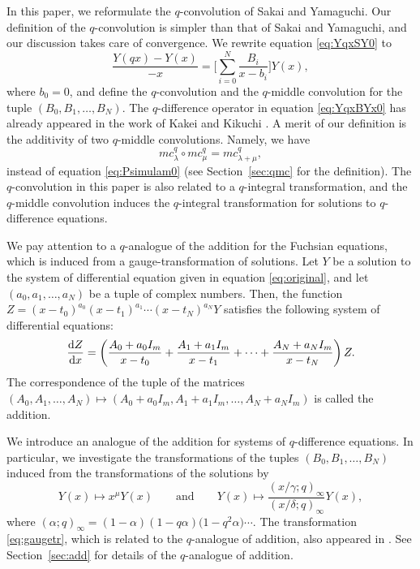\documentclass[pdftex]{sigma}
\numberwithin{equation}{section}
\theoremstyle{definition}
\begin{document}
In this paper, we reformulate the $q$-convolution of Sakai and Yamaguchi.
Our definition of the $q$-convolution is simpler than that of Sakai and Yamaguchi, and our discussion takes care of convergence.
We rewrite equation \eqref{eq:YqxSY0} to
\begin{equation}
\frac{Y(q x) - Y(x )}{-x} = \Bigg[ \sum^{N}_{i = 0}\frac{B_{i}}{x -b_{i}} \Bigg] Y(x) ,
\label{eq:YqxBYx0}
\end{equation}
where $b_0=0$, and define the $q$-convolution and the $q$-middle convolution for the tuple $(B_0, B_1,\allowbreak \dots , B_N)$.
The $q$-difference operator in equation \eqref{eq:YqxBYx0} has already appeared in the work of Kakei and Kikuchi \cite{KK}.
A merit of our definition is the additivity of two $q$-middle convolutions.
Namely, we have
\begin{equation}
mc^q _{\lambda} \circ mc^q _{\mu} = mc^q _{\lambda + \mu} ,
\label{eq:mcaddi0}
\end{equation}
instead of equation \eqref{eq:Psimulam0} (see Section~\ref{sec:qmc} for the definition).
The $q$-convolution in this paper is also related to a $q$-integral transformation, and the $q$-middle convolution induces the $q$-integral transformation for solutions to $q$-difference equations.

We pay attention to a $q$-analogue of the addition for the Fuchsian equations, which is induced from a gauge-transformation of solutions.
Let $Y$ be a solution to the system of differential equation given in equation \eqref{eq:original}, and let $(a_0, a_1, \dots , a_N)$ be a tuple of complex numbers.
Then, the function $Z= (x-t_0)^{a_0} (x-t_1)^{a_1} \cdots (x-t_N)^{a_N} Y$ satisfies the following system of differential equations:
\begin{equation*}
\frac{{\rm d}Z}{{\rm d}x}=\left( \frac{A_0+a_0 I_m}{x-t_0}+\frac{A_1+a_1 I_m}{x-t_1}+\dots + \frac{A_N + a_N I_m}{x-t_N} \right) Z.
\end{equation*}
The correspondence of the tuple of the matrices $(A_0, A_1, \dots ,A_N ) \mapsto (A_0 + a_0 I_m , A_1 +a_1 I_m ,\dots , \allowbreak A_N +a_N I_m )$ is called the addition.

We introduce an analogue of the addition for systems of $q$-difference equations.
In particular, we investigate the transformations of the tuples $(B_0, B_1, \dots , B_N) $ induced from the transformations of the solutions by
\begin{equation} \label{eq:gaugetr}
Y(x) \mapsto x^{\mu } Y(x)\qquad \text{and} \qquad Y(x) \mapsto \frac{(x/\gamma ;q )_{\infty }}{(x/\delta ;q )_{\infty }} Y(x) ,
\end{equation}
where
$
(\alpha ;q ) _{\infty } = (1-\alpha )(1-q \alpha )\bigl(1-q^2 \alpha \bigr) \cdots $.
The transformation \eqref{eq:gaugetr}, which is related to the $q$-analogue of addition, also appeared in \cite{KK}.
See Section~\ref{sec:add} for details of the $q$-analogue of addition.
\end{document}
